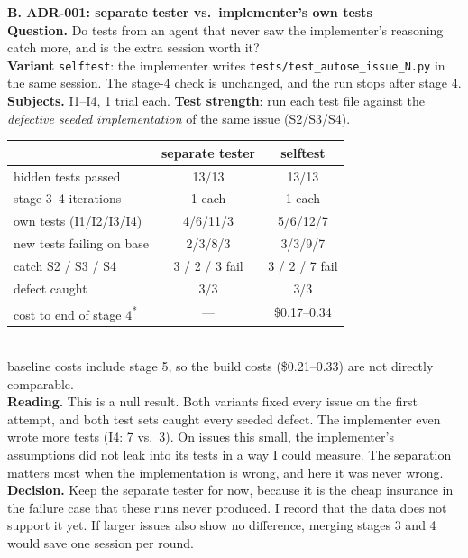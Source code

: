 \documentclass[11pt,a4paper]{article}
\begin{document}
\begin{minipage}[t]{0.488\textwidth}
\textbf{B. ADR-001: separate tester vs.\ implementer's own tests}\\[2pt]
\small
\textbf{Question.} Do tests from an agent that never saw the implementer's reasoning catch more,
and is the extra session worth it?\\
\textbf{Variant} \texttt{selftest}: the implementer writes \texttt{tests/test\_autose\_issue\_N.py} in
the same session. The stage-4 check is unchanged, and the run stops after stage 4.\\
\textbf{Subjects.} I1--I4, 1 trial each. \textbf{Test strength}: run each test file against the
\emph{defective seeded implementation} of the same issue (S2/S3/S4).\\[3pt]
\scriptsize
\begin{tabular}{@{}lcc@{}}
\toprule
 & separate tester & selftest \\
\midrule
hidden tests passed & 13/13 & 13/13 \\
stage 3--4 iterations & 1 each & 1 each \\
own tests (I1/I2/I3/I4) & 4/6/11/3 & 5/6/12/7 \\
new tests failing on base & 2/3/8/3 & 3/3/9/7 \\
catch S2 / S3 / S4 & 3 / 2 / 3 fail & 3 / 2 / 7 fail \\
defect caught & 3/3 & 3/3 \\
cost to end of stage 4\textsuperscript{*} & --- & \$0.17--0.34 \\
\bottomrule
\end{tabular}\\
{\tiny * baseline costs include stage 5, so the build costs (\$0.21--0.33) are not directly comparable.}\\[2pt]
\small
\textbf{Reading.} This is a null result. Both variants fixed every issue on the first attempt, and
both test sets caught every seeded defect. The implementer even wrote more tests (I4: 7 vs.\ 3). On
issues this small, the implementer's assumptions did not leak into its tests in a way I could
measure. The separation matters most when the implementation is wrong, and here it was never wrong.\\
\textbf{Decision.} Keep the separate tester for now, because it is the cheap insurance in the
failure case that these runs never produced. I record that the data does not support it yet. If
larger issues also show no difference, merging stages 3 and 4 would save one session per round.
\end{minipage}
\end{document}
